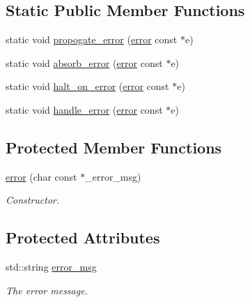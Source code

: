 \subsection*{\-Static \-Public \-Member \-Functions}
\begin{DoxyCompactItemize}
\item 
static void \hyperlink{classutil_1_1common_1_1error_a50f2c51ec896fdd16280c5bc0b894d6c}{propogate\-\_\-error} (\hyperlink{classutil_1_1common_1_1error}{error} const $\ast$e)
\item 
static void \hyperlink{classutil_1_1common_1_1error_a110cf0bb4bff2b185d72e4a45dac21cc}{absorb\-\_\-error} (\hyperlink{classutil_1_1common_1_1error}{error} const $\ast$e)
\item 
static void \hyperlink{classutil_1_1common_1_1error_a9ba845c0e9e65f1bdba09c805f458d4e}{halt\-\_\-on\-\_\-error} (\hyperlink{classutil_1_1common_1_1error}{error} const $\ast$e)
\item 
static void \hyperlink{classutil_1_1common_1_1error_a21000e1fac6d6721d29752be0139c105}{handle\-\_\-error} (\hyperlink{classutil_1_1common_1_1error}{error} const $\ast$e)
\end{DoxyCompactItemize}
\subsection*{\-Protected \-Member \-Functions}
\begin{DoxyCompactItemize}
\item 
\hypertarget{classutil_1_1common_1_1error_a09a1f3ece8a1cfa11b6cfe808810f918}{\hyperlink{classutil_1_1common_1_1error_a09a1f3ece8a1cfa11b6cfe808810f918}{error} (char const $\ast$\-\_\-error\-\_\-msg)}\label{classutil_1_1common_1_1error_a09a1f3ece8a1cfa11b6cfe808810f918}

\begin{DoxyCompactList}\small\item\em \-Constructor. \end{DoxyCompactList}\end{DoxyCompactItemize}
\subsection*{\-Protected \-Attributes}
\begin{DoxyCompactItemize}
\item 
\hypertarget{classutil_1_1common_1_1error_a60addfad97aa8d99f59ac8bea242e548}{std\-::string \hyperlink{classutil_1_1common_1_1error_a60addfad97aa8d99f59ac8bea242e548}{error\-\_\-msg}}\label{classutil_1_1common_1_1error_a60addfad97aa8d99f59ac8bea242e548}

\begin{DoxyCompactList}\small\item\em \-The error message. \end{DoxyCompactList}\end{DoxyCompactItemize}
